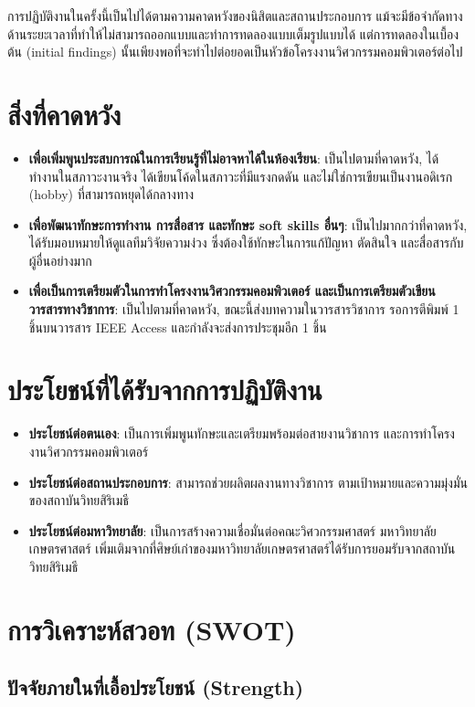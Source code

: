 \documentclass[16pt,a4]{internshipreport}
\begin{document}
การปฏิบัติงานในครั้งนี้เป็นไปได้ตามความคาดหวังของนิสิตและสถานประกอบการ แม้จะมีข้อจำกัดทางด้านระยะเวลาที่ทำให้ไม่สามารถออกแบบและทำการทดลองแบบเต็มรูปแบบได้ แต่การทดลองในเบื้องต้น (initial findings) นั้นเพียงพอที่จะทำไปต่อยอดเป็นหัวข้อโครงงานวิศวกรรมคอมพิวเตอร์ต่อไป

\section{สิ่งที่คาดหวัง}
\begin{itemize}
    \item \textbf{เพื่อเพิ่มพูนประสบการณ์ในการเรียนรู้ที่ไม่อาจหาได้ในห้องเรียน}: เป็นไปตามที่คาดหวัง, ได้ทำงานในสภาวะงานจริง ได้เขียนโค้ดในสภาวะที่มีแรงกดดัน และไม่ใช่การเขียนเป็นงานอดิเรก (hobby) ที่สามารถหยุดได้กลางทาง
    \item \textbf{เพื่อพัฒนาทักษะการทำงาน การสื่อสาร และทักษะ soft skills อื่นๆ}: เป็นไปมากกว่าที่คาดหวัง, ได้รับมอบหมายให้ดูแลทีมวิจัยความง่วง ซึ่งต้องใช้ทักษะในการแก้ปัญหา ตัดสินใจ และสื่อสารกับผู้อื่นอย่างมาก
    \item \textbf{เพื่อเป็นการเตรียมตัวในการทำโครงงานวิศวกรรมคอมพิวเตอร์ และเป็นการเตรียมตัวเขียนวารสารทางวิชาการ}: เป็นไปตามที่คาดหวัง, ขณะนี้ส่งบทความในวารสารวิชาการ รอการตีพิมพ์ 1 ชิ้นบนวารสาร IEEE Access และกำลังจะส่งการประชุมอีก 1 ชิ้น
\end{itemize}

\section{ประโยชน์ที่ได้รับจากการปฏิบัติงาน}
\begin{itemize}
    \item \textbf{ประโยชน์ต่อตนเอง}: เป็นการเพิ่มพูนทักษะและเตรียมพร้อมต่อสายงานวิชาการ และการทำโครงงานวิศวกรรมคอมพิวเตอร์
    \item \textbf{ประโยชน์ต่อสถานประกอบการ}: สามารถช่วยผลิตผลงานทางวิชาการ ตามเป้าหมายและความมุ่งมั่นของสถาบันวิทยสิริเมธี
    \item \textbf{ประโยชน์ต่อมหาวิทยาลัย}: เป็นการสร้างความเชื่อมั่นต่อคณะวิศวกรรมศาสตร์ มหาวิทยาลัยเกษตรศาสตร์ เพิ่มเติมจากที่ศิษย์เก่าของมหาวิทยาลัยเกษตรศาสตร์ได้รับการยอมรับจากสถาบันวิทยสิริเมธี
\end{itemize}

\section{การวิเคราะห์สวอท (SWOT)}
\subsection{ปัจจัยภายในที่เอื้อประโยชน์ (Strength)}
\end{document}

